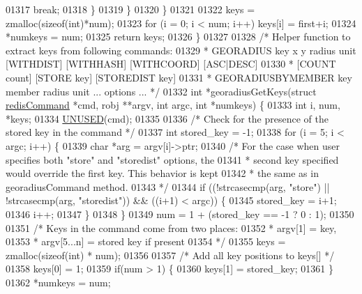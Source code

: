 \begin{DoxyCode}
01317                 \textcolor{keywordflow}{break};
01318             \}
01319         \}
01320     \}
01321 
01322     keys = zmalloc(\textcolor{keyword}{sizeof}(\textcolor{keywordtype}{int})*num);
01323     \textcolor{keywordflow}{for} (i = 0; i < num; i++) keys[i] = first+i;
01324     *numkeys = num;
01325     \textcolor{keywordflow}{return} keys;
01326 \}
01327 
01328 \textcolor{comment}{/* Helper function to extract keys from following commands:}
01329 \textcolor{comment}{ * GEORADIUS key x y radius unit [WITHDIST] [WITHHASH] [WITHCOORD] [ASC|DESC]}
01330 \textcolor{comment}{ *                             [COUNT count] [STORE key] [STOREDIST key]}
01331 \textcolor{comment}{ * GEORADIUSBYMEMBER key member radius unit ... options ... */}
01332 \textcolor{keywordtype}{int} *georadiusGetKeys(\textcolor{keyword}{struct} \hyperlink{structredisCommand}{redisCommand} *cmd, robj **argv, \textcolor{keywordtype}{int} argc, \textcolor{keywordtype}{int} *numkeys) \{
01333     \textcolor{keywordtype}{int} i, num, *keys;
01334     \hyperlink{server_8h_ae7c9dc8f13568a9c856573751f1ee1ec}{UNUSED}(cmd);
01335 
01336     \textcolor{comment}{/* Check for the presence of the stored key in the command */}
01337     \textcolor{keywordtype}{int} stored\_key = -1;
01338     \textcolor{keywordflow}{for} (i = 5; i < argc; i++) \{
01339         \textcolor{keywordtype}{char} *arg = argv[i]->ptr;
01340         \textcolor{comment}{/* For the case when user specifies both "store" and "storedist" options, the}
01341 \textcolor{comment}{         * second key specified would override the first key. This behavior is kept }
01342 \textcolor{comment}{         * the same as in georadiusCommand method.}
01343 \textcolor{comment}{         */}
01344         \textcolor{keywordflow}{if} ((!strcasecmp(arg, \textcolor{stringliteral}{"store"}) || !strcasecmp(arg, \textcolor{stringliteral}{"storedist"})) && ((i+1) < argc)) \{
01345             stored\_key = i+1;
01346             i++;
01347         \}
01348     \}
01349     num = 1 + (stored\_key == -1 ? 0 : 1);
01350 
01351     \textcolor{comment}{/* Keys in the command come from two places:}
01352 \textcolor{comment}{     * argv[1] = key,}
01353 \textcolor{comment}{     * argv[5...n] = stored key if present}
01354 \textcolor{comment}{     */}
01355     keys = zmalloc(\textcolor{keyword}{sizeof}(\textcolor{keywordtype}{int}) * num);
01356 
01357     \textcolor{comment}{/* Add all key positions to keys[] */}
01358     keys[0] = 1;
01359     \textcolor{keywordflow}{if}(num > 1) \{
01360          keys[1] = stored\_key;
01361     \}
01362     *numkeys = num;

\end{DoxyCode}
